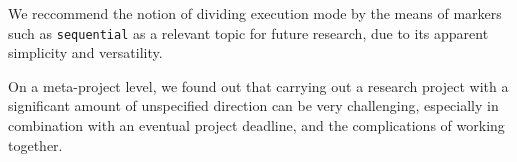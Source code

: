 We reccommend the notion of dividing execution mode by the means of markers
such as \lstinline{sequential} as a relevant topic for future research, due to
its apparent simplicity and versatility.

On a meta-project level, we found out that carrying out a research project with
a significant amount of unspecified direction can be very challenging,
especially in combination with an eventual project deadline, and the
complications of working together.

